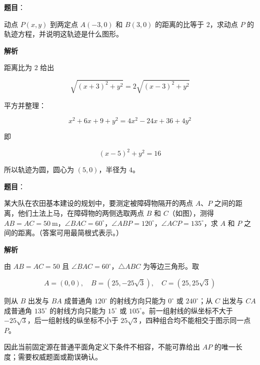 \begin{answer}

\textbf{题目}：

动点 $P(x,y)$ 到两定点 $A(-3,0)$ 和 $B(3,0)$ 的距离的比等于 $2$，求动点 $P$ 的轨迹方程，并说明这轨迹是什么图形。

\textbf{解析}

距离比为 $2$ 给出

\nopagebreak[4]
\[
\sqrt{(x+3)^2+y^2}=2\sqrt{(x-3)^2+y^2}
\]

平方并整理：

\nopagebreak[4]
\[
x^2+6x+9+y^2=4x^2-24x+36+4y^2
\]

即

\nopagebreak[4]
\[
(x-5)^2+y^2=16
\]

所以轨迹为圆，圆心为 $(5,0)$，半径为 $4$。


\end{answer}
\begin{answer}

\textbf{题目}：

某大队在农田基本建设的规划中，要测定被障碍物隔开的两点 $A\text{、}P$ 之间的距离，他们土法上马，在障碍物的两侧选取两点 $B$ 和 $C$（如图），测得 $AB=AC=50\ \mathrm m$，$\angle BAC=60^\circ$，$\angle ABP=120^\circ$，$\angle ACP=135^\circ$，求 $A$ 和 $P$ 之间的距离。（答案可用最简根式表示。）
\nopagebreak[4]
\begin{center}\end{center}
\nopagebreak[4]
\textbf{解析}

由 $AB=AC=50$ 且 $\angle BAC=60^\circ$，$\triangle ABC$ 为等边三角形。取

\nopagebreak[4]
\[
A=(0,0),\quad B=(25,-25\sqrt3),\quad C=(25,25\sqrt3)
\]

则从 $B$ 出发与 $BA$ 成普通角 $120^\circ$ 的射线方向只能为 $0^\circ$ 或 $240^\circ$；从 $C$ 出发与 $CA$ 成普通角 $135^\circ$ 的射线方向只能为 $15^\circ$ 或 $105^\circ$。前一组射线的纵坐标不大于 $-25\sqrt3$，后一组射线的纵坐标不小于 $25\sqrt3$，四种组合均不能相交于图示同一点 $P$。

因此当前固定源在普通平面角定义下条件不相容，不能可靠给出 $AP$ 的唯一长度；需要权威题面或勘误确认。


\end{answer}
